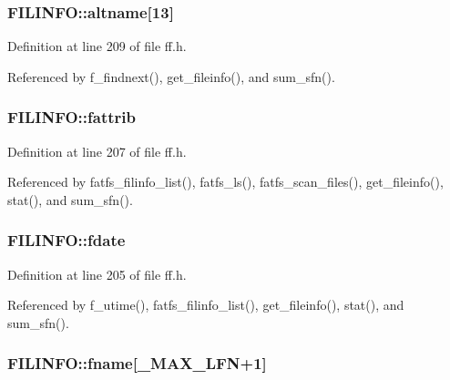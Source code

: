 \subsubsection[{\texorpdfstring{altname}{altname}}]{ F\+I\+L\+I\+N\+F\+O\+::altname\mbox{[}13\mbox{]}}\hypertarget{structFILINFO_a37243296fadacbde8500b5668d99682e}{}\label{structFILINFO_a37243296fadacbde8500b5668d99682e}


Definition at line 209 of file ff.\+h.



Referenced by f\+\_\+findnext(), get\+\_\+fileinfo(), and sum\+\_\+sfn().

\subsubsection[{\texorpdfstring{fattrib}{fattrib}}]{ F\+I\+L\+I\+N\+F\+O\+::fattrib}\hypertarget{structFILINFO_a838d542585831b085537b363f18205c0}{}\label{structFILINFO_a838d542585831b085537b363f18205c0}


Definition at line 207 of file ff.\+h.



Referenced by fatfs\+\_\+filinfo\+\_\+list(), fatfs\+\_\+ls(), fatfs\+\_\+scan\+\_\+files(), get\+\_\+fileinfo(), stat(), and sum\+\_\+sfn().

\subsubsection[{\texorpdfstring{fdate}{fdate}}]{ F\+I\+L\+I\+N\+F\+O\+::fdate}\hypertarget{structFILINFO_a7c01c48a15b1b49da459924437b0bd52}{}\label{structFILINFO_a7c01c48a15b1b49da459924437b0bd52}


Definition at line 205 of file ff.\+h.



Referenced by f\+\_\+utime(), fatfs\+\_\+filinfo\+\_\+list(), get\+\_\+fileinfo(), stat(), and sum\+\_\+sfn().

\subsubsection[{\texorpdfstring{fname}{fname}}]{ F\+I\+L\+I\+N\+F\+O\+::fname\mbox{[}{\bf \+\_\+\+M\+A\+X\+\_\+\+L\+FN}+1\mbox{]}}\hypertarget{structFILINFO_a7c3ce2dd03dc9a9726967fc43116079f}{}\label{structFILINFO_a7c3ce2dd03dc9a9726967fc43116079f}


